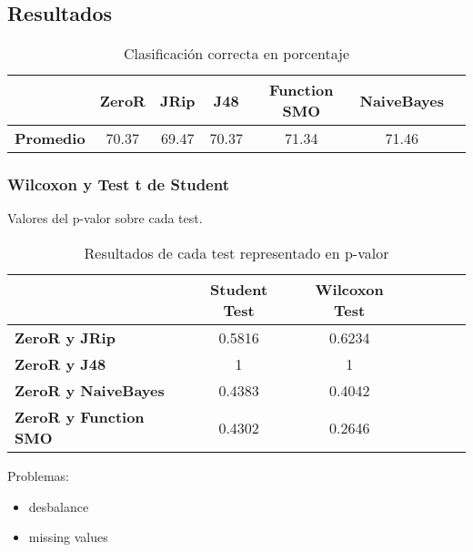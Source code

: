 \subsection{Resultados}

\begin{table}[H]
	\centering
	\begin{tabular}{|l|c|c|c|c|c|c|}
		\hline
		\textbf{}  & \textbf{ZeroR} & \textbf{JRip} & \textbf{J48} & \textbf{Function SMO} & \textbf{NaiveBayes} \\ \hline
		\textbf{Promedio} & 70.37  & 69.47 & 70.37 & 71.34 & 71.46 \\ \hline
	\end{tabular}
	\caption{Clasificación correcta en porcentaje}
	\label{}
\end{table}


\subsubsection{Wilcoxon y Test t de Student}

Valores del p-valor sobre cada test.

\begin{table}[H]
	\centering
	\begin{tabular}{|l|c|c|c|c|c|c|}
		\hline
		\textbf{}  & \textbf{Student Test} & \textbf{Wilcoxon Test} \\ \hline
		\textbf{ZeroR y JRip}  & 0.5816 & 0.6234 \\ \hline
		\textbf{ZeroR y J48}  & 1 & 1 \\ \hline
		\textbf{ZeroR y NaiveBayes}  & 0.4383 & 0.4042 \\ \hline
		\textbf{ZeroR y Function SMO}  & 0.4302 & 0.2646 \\ \hline
	\end{tabular}
	\caption{Resultados de cada test representado en p-valor}
	\label{res_tests_wilcoxon_student}
\end{table}


Problemas:
\begin{itemize}
	\item desbalance
	\item missing values
\end{itemize}